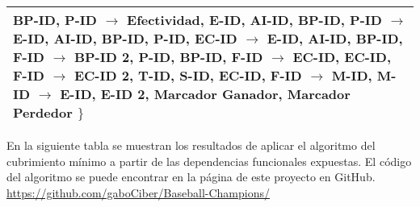 \documentclass{report}
\begin{document}
\begin{tabularx}{\textwidth}{|X|}
        \hspace*{0.9cm} BP-ID, P-ID $\rightarrow$ Efectividad, \newline
        \hspace*{0.9cm} E-ID, AI-ID, BP-ID, P-ID $\rightarrow$ E-ID, AI-ID, BP-ID, P-ID, \newline
        \hspace*{0.9cm} EC-ID $\rightarrow$ E-ID, AI-ID, \newline
        \hspace*{0.9cm} BP-ID, F-ID $\rightarrow$ BP-ID 2, P-ID, \newline
        \hspace*{0.9cm} BP-ID, F-ID $\rightarrow$ EC-ID, \newline
        \hspace*{0.9cm} EC-ID, F-ID $\rightarrow$ EC-ID 2, T-ID, S-ID, \newline
        \hspace*{0.9cm} EC-ID, F-ID $\rightarrow$ M-ID, \newline
        \hspace*{0.9cm} M-ID $\rightarrow$ E-ID, E-ID 2, Marcador Ganador, Marcador Perdedor        
        $\} $
        \vspace*{0.15cm} \\    
        \bottomrule
    \end{tabularx}

    \vspace*{0.3cm}
    En la siguiente tabla se muestran los resultados de aplicar el algoritmo del cubrimiento mínimo a partir de las dependencias funcionales expuestas. 
    El código del algoritmo se puede encontrar en la página de este proyecto en GitHub. \url{https://github.com/gaboCiber/Baseball-Champions/} 
\end{document}

